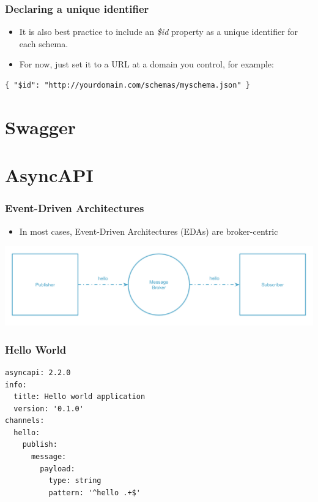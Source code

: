 \documentclass{efd-lecture}
\begin{document}
\begin{frame}[fragile]
  \frametitle{Declaring a unique identifier}
  \begin{itemize}
    \item It is also best practice to include an
      \textit{\color{YellowOrange} \$id} property as a unique identifier for
      each schema.
    \item For now, just set it to a URL at a domain you control, for example:
  \end{itemize}
  \begin{verbatim}
{ "$id": "http://yourdomain.com/schemas/myschema.json" }
  \end{verbatim}
\end{frame}

\section{Swagger}

\section{AsyncAPI}

\begin{frame}
  \frametitle{Event-Driven Architectures}
  \begin{itemize}
    \item In most cases, Event-Driven Architectures (EDAs) are broker-centric
  \end{itemize}
  \includegraphics[width=\textwidth]{./img/simple-event-driven.png}
\end{frame}

\begin{frame}[fragile]
  \frametitle{Hello World}
  \begin{verbatim}
asyncapi: 2.2.0
info:
  title: Hello world application
  version: '0.1.0'
channels:
  hello:
    publish:
      message:
        payload:
          type: string
          pattern: '^hello .+$'
  \end{verbatim}
\end{frame}
\end{document}
